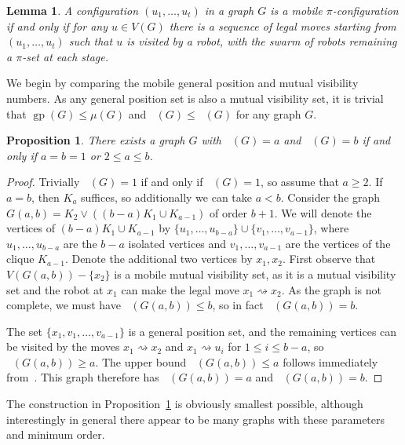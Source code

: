 \documentclass[a4paper,12pt]{article}
\DeclareMathOperator{\mob}{Mob_{gp}}
\DeclareMathOperator{\mobmv}{Mob_{\mu}}
\DeclareMathOperator{\gp}{gp}
\newtheorem{lemma}[theorem]{Lemma}
\newtheorem{proposition}[theorem]{Proposition}
\theoremstyle{definition}
\newcommand{\move}{\rightsquigarrow}
\begin{document}
	\begin{lemma}\label{lem:mobility}
		A configuration $(u_1,\dots ,u_t)$ in a graph $G$ is a mobile $\pi $-configuration if and only if for any $u \in V(G)$ there is a sequence of legal moves starting from $(u_1,\dots ,u_t)$ such that $u$ is visited by a robot, with the swarm of robots remaining a $\pi $-set at each stage.
	\end{lemma}
	
	We begin by comparing the mobile general position and mutual visibility numbers. As any general position set is also a mutual visibility set, it is trivial that $\gp (G) \leq \mu (G)$ and $\mob (G) \leq \mobmv (G)$ for any graph $G$. 
	
	\begin{proposition}\label{prop:realisation}
		There exists a graph $G$ with $\mob (G) = a$ and $\mobmv (G) = b$ if and only if $a = b = 1$ or $2 \leq a \leq b$.
	\end{proposition}
	\begin{proof}
		Trivially $\mob (G) = 1$ if and only if $\mobmv (G) = 1$, so assume that $a \geq 2$. If $a = b$, then $K_a$ suffices, so additionally we can take $a < b$. Consider the graph $G(a,b) = K_2 \vee ((b-a)K_1 \cup K_{a-1})$ of order $b+1$. We will denote the vertices of $(b-a)K_1 \cup K_{a-1}$ by $\{ u_1,\dots ,u_{b-a}\} \cup \{ v_1,\dots ,v_{a-1}\} $, where $u_1,\dots ,u_{b-a}$ are the $b-a$ isolated vertices and $v_1, \dots , v_{a-1}$ are the vertices of the clique $K_{a-1}$. Denote the additional two vertices by $x_1,x_2$. First observe that $V(G(a,b))-\{ x_2\} $ is a mobile mutual visibility set, as it is a mutual visibility set and the robot at $x_1$ can make the legal move $x_1 \move x_2$. As the graph is not complete, we must have $\mobmv (G(a,b)) \leq b$, so in fact $\mobmv (G(a,b)) = b$.
		
		The set $\{ x_1,v_1, \dots , v_{a-1}\} $ is a general position set, and the remaining vertices can be visited by the moves $x_1 \move x_2$ and $x_1 \move u_i$ for $1 \leq i \leq b-a$, so $\mob (G(a,b)) \geq a$. The upper bound $\mob (G(a,b)) \leq a$ follows immediately from~\cite[Theorem 4.4]{Cartesian}. This graph therefore has $\mob (G(a,b)) = a$ and $\mobmv (G(a,b)) = b$.
	\end{proof}
	The construction in Proposition~\ref{prop:realisation} is obviously smallest possible, although interestingly in general there appear to be many graphs with these parameters and minimum order.
	
	
	
\end{document}
